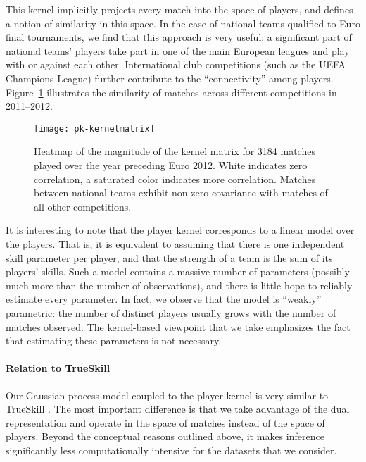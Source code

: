 This kernel implicitly projects every match into the space of players, and defines a notion of similarity in this space.
In the case of national teams qualified to Euro final tournaments, we find that this approach is very useful: a significant part of national teams' players take part in one of the main European leagues and play with or against each other.
International club competitions (such as the UEFA Champions League) further contribute to the ``connectivity'' among players.
Figure~\ref{pk:fig:kernel} illustrates the similarity of matches across different competitions in 2011--2012.


\begin{figure}
  \centering
  \texttt{[image: pk-kernelmatrix]}
  \caption{Heatmap of the magnitude of the kernel matrix for \num{3184} matches played over the year preceding Euro 2012.
White indicates zero correlation, a saturated color indicates more correlation.
Matches between national teams exhibit non-zero covariance with matches of all other competitions.
}
  \label{pk:fig:kernel}
\end{figure}

It is interesting to note that the player kernel corresponds to a linear model over the players.
That is, it is equivalent to assuming that there is one independent skill parameter per player, and that the strength of a team is the sum of its players' skills.
Such a model contains a massive number of parameters (possibly much more than the number of observations), and there is little hope to reliably estimate every parameter.
In fact, we observe that the model is ``weakly'' parametric: the number of distinct players usually grows with the number of matches observed.
The kernel-based viewpoint that we take emphasizes the fact that estimating these parameters is not necessary.

\paragraph{Relation to TrueSkill}
Our Gaussian process model coupled to the player kernel is very similar to TrueSkill \citep{herbrich2006trueskill}.
The most important difference is that we take advantage of the dual representation and operate in the space of matches instead of the space of players.
Beyond the conceptual reasons outlined above, it makes inference significantly less computationally intensive for the datasets that we consider.
